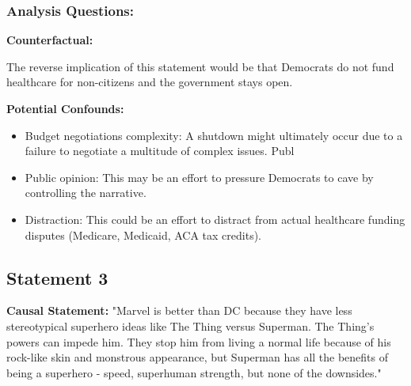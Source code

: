 \documentclass[12pt]{article}
\begin{document}
\subsubsection{Analysis Questions:}

\textbf{Counterfactual:}

The reverse implication of this statement would be that Democrats do not fund healthcare for non-citizens and the government stays open.

\vspace{0.5in}

\textbf{Potential Confounds:}
\begin{itemize}
    \item Budget negotiations complexity: A shutdown might ultimately occur due to a failure to negotiate a multitude of complex issues. Publ 
    \item Public opinion: This may be an effort to pressure Democrats to cave by controlling the narrative.
    \item Distraction: This could be an effort to distract from actual healthcare funding disputes (Medicare, Medicaid, ACA tax credits).
\end{itemize}

\vspace{0.5in}

\subsection*{Statement 3}

\textbf{Causal Statement:} "Marvel is better than DC because they have less stereotypical superhero ideas like The Thing versus Superman. The Thing's powers can impede him. They stop him from living a normal life because of his rock-like skin and monstrous appearance, but Superman has all the benefits of being a superhero - speed, superhuman strength, but none of the downsides."

\begin{center}
\end{center}
\end{document}
